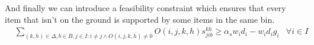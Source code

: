 And finally we can introduce a feasibility constraint which ensures that every item that isn't on the ground is supported by some items in the same bin.
\begin{eqnarray}
    & \sum\limits_{(k, h) \in \Delta, b \in B, j \in I : i \neq j \land O(i, j, k, h) \neq 0}{ O(i, j, k, h)s^{k h}_{j i b}} \ge \alpha_s w_i d_i - w_i d_i g_i & \forall i \in I \label{cons:every_item_is_supported}
\end{eqnarray}